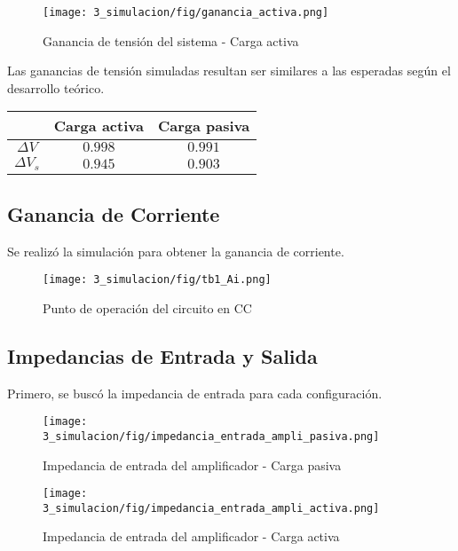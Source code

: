 \begin{figure}[H]
    \centering
    \texttt{[image: 3\_simulacion/fig/ganancia\_activa.png]}
    \label{mediciones_pol_activa}
    \caption{Ganancia de tensión del sistema -  Carga activa}
\end{figure}

Las ganancias de tensión simuladas resultan ser similares a las esperadas según el desarrollo teórico.
\begin{table}[H]
    \centering
    \begin{tabular}{|c|c|c|}
    \hline
                        & Carga activa & Carga pasiva  \\ \hline
    $\Delta V$        & $0.998$   & $0.991$    \\ \hline
    $\Delta V_s$        & $0.945$   & $0.903$  \\ \hline
    \end{tabular}
    \end{table}


\subsection{Ganancia de Corriente}
Se realizó la simulación para obtener la ganancia de corriente.
\begin{figure}[H]
    \centering
    \texttt{[image: 3\_simulacion/fig/tb1\_Ai.png]}
    \label{mediciones_pol_activa}
    \caption{Punto de operación del circuito en CC}
\end{figure}


\subsection{Impedancias de Entrada y Salida}
Primero, se buscó la impedancia de entrada para cada configuración.

\begin{figure}[H]
    \centering
    \texttt{[image: 3\_simulacion/fig/impedancia\_entrada\_ampli\_pasiva.png]}
    \label{mediciones_pol_activa}
    \caption{Impedancia de entrada del amplificador - Carga pasiva}
\end{figure}

\begin{figure}[H]
    \centering
    \texttt{[image: 3\_simulacion/fig/impedancia\_entrada\_ampli\_activa.png]}
    \label{mediciones_pol_activa}
    \caption{Impedancia de entrada del amplificador - Carga activa}
\end{figure}

